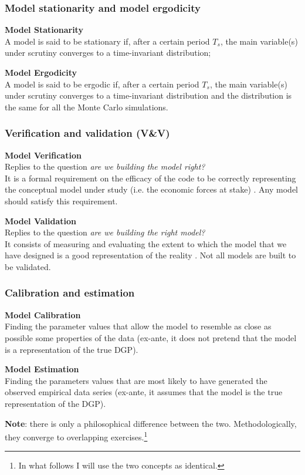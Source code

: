 \documentclass[10pt]{beamer}
\begin{document}
\begin{frame}[c]\frametitle{Model stationarity and model ergodicity}
	\alert{\textbf{Model Stationarity}} 
	\\ A model is said to be stationary if, after a certain period $T_{s}$, the main variable(s) under scrutiny converges to a time-invariant distribution; \bigskip 

	\alert{\textbf{Model Ergodicity}} 
	\\ A model is said to be ergodic if, after a certain period $T_{s}$, the main variable(s) under scrutiny converges to a time-invariant distribution and the distribution is the same for all the Monte Carlo simulations. \bigskip
\end{frame}


\begin{frame}[c]\frametitle{Verification and validation (V\&V)}
	\alert{\textbf{Model Verification}} 
	\\ Replies to the question \emph{are we building the model right?} \\ It is a formal requirement on the efficacy of the code to be correctly representing the conceptual model under study (i.e. the economic forces at stake) \citep{yilmaz2006verification,naylor1967verification}. Any model should satisfy this requirement. \bigskip %

	\alert{\textbf{Model Validation}} 
	\\ Replies to the question \emph{are we building the right model?} \\ It consists of measuring and evaluating the extent to which the model that we have designed is a good representation of the reality \citep{marks2013validation}. Not all models are built to be validated. \bigskip

\end{frame}


\begin{frame}[c]\frametitle{Calibration and estimation}
	\alert{\textbf{Model Calibration}} 
	\\ Finding the parameter values that allow the model to resemble as close as possible some properties of the data (ex-ante, it does not pretend that the model is a representation of the true DGP). \bigskip

	\alert{\textbf{Model Estimation}} 
	\\ Finding the parameters values that are most likely to have generated the observed empirical data series (ex-ante, it assumes that the model is the true representation of the DGP). \bigskip

	\textbf{Note}: there is only a philosophical difference between the two. Methodologically, they converge to overlapping exercises.\footnote{In what follows I will use the two concepts as identical.}
\end{frame}
\end{document}
